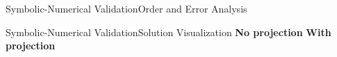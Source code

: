 \begin{frame}{Symbolic-Numerical Validation}{Order and Error Analysis}
  \centering{\small{}}
\end{frame}

\begin{frame}{Symbolic-Numerical Validation}{Solution Visualization}
  \vspace{-1.0em}
  \vspace{1.0em}
  \centering\small
  \textbf{No projection}%
  \hspace{10.0em}%
  \textbf{With projection}
\end{frame}

